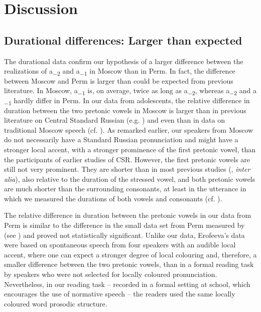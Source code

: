 \documentclass[output=paper,colorlinks,citecolor=black]{langscibook}
\begin{document}
\section{Discussion}

\subsection{Durational differences: Larger than expected}

The durational data confirm our hypothesis of a larger difference between the realizations of a\textsubscript{\tiny{$-2$}} and a\textsubscript{\tiny{$-1$}} in Moscow than in Perm. In fact, the difference between Moscow and Perm is larger than could be expected from previous literature. In Moscow, a\textsubscript{\tiny{$-1$}} is, on average, twice as long as a\textsubscript{\tiny{$-2$}}, whereas a\textsubscript{\tiny{$-2$}} and a\textsubscript{\tiny{$-1$}} hardly differ in Perm. In our data from adolescents, the relative difference in duration between the two pretonic vowels in Moscow is larger than in previous literature on Central Standard Russian (e.g. \citealt{Zlatoustova1981,Kuznecov1997,Barnes2006,Knjazev2006}) and even than in  data on traditional Moscow speech (cf. \citealt{Post2024}). As remarked earlier, our speakers from Moscow do not necessarily have a Standard Russian pronunciation and might have a stronger local accent, with a stronger prominence of the first pretonic vowel, than the participants of earlier studies of CSR. However, the first pretonic vowels are still not very prominent. They are shorter than in most previous studies (\citealt{Zlatoustova1981}, \textit{inter alia}), also relative to the duration of the stressed vowel, and both pretonic vowels are much shorter than the surrounding consonants, at least in the utterance in which we measured the durations of both vowels and consonants (cf. \citealt{Post2024}). 

The relative difference in duration between the pretonic vowels in our data from Perm is similar to the difference in the small data set from Perm measured by \citet{Erofeeva2005} (see \citealt{Post2024}) and proved not statistically significant. Unlike our data, Erofeeva’s data were based on spontaneous speech from four speakers with an audible local accent, where one can expect a stronger degree of local colouring and, therefore, a smaller difference between the two pretonic vowels, than in a formal reading task by speakers who were not selected for locally coloured pronunciation. Nevertheless, in our reading task -- recorded in a formal setting at school, which encourages the use of normative speech -- the readers used the same locally coloured word prosodic structure.
\end{document}
